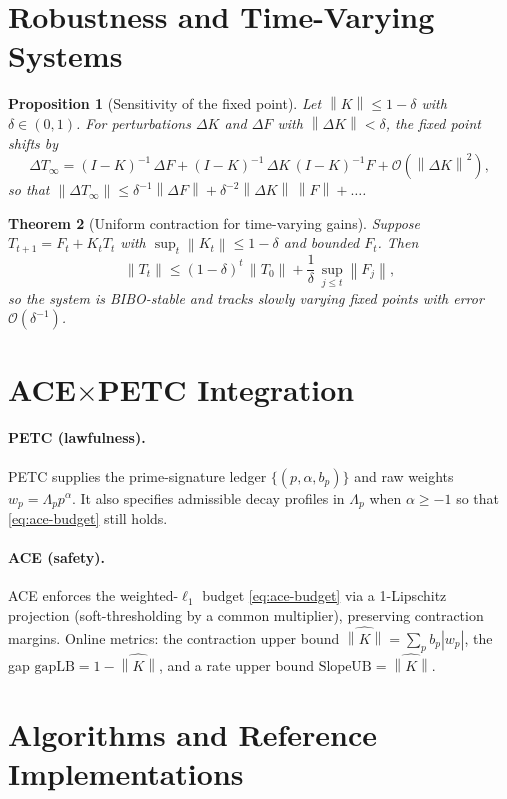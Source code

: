 \documentclass[11pt]{article}
\theoremstyle{plain}
\newtheorem{theorem}{Theorem}
\newtheorem{proposition}[theorem]{Proposition}
\theoremstyle{definition}
\theoremstyle{remark}
\newcommand{\norm}[1]{\left\lVert #1 \right\rVert}
\begin{document}
\section{Robustness and Time-Varying Systems}
\begin{proposition}[Sensitivity of the fixed point]
Let $\norm{K}\le 1-\delta$ with $\delta\in(0,1)$. For perturbations $\Delta K$ and $\Delta F$ with $\norm{\Delta K}<\delta$, the fixed point shifts by
\[
  \Delta T_\infty = (I-K)^{-1}\,\Delta F + (I-K)^{-1}\,\Delta K\,(I-K)^{-1}F + \mathcal{O}(\norm{\Delta K}^2),
\]
so that $\norm{\Delta T_\infty}\le \delta^{-1}\norm{\Delta F} + \delta^{-2}\norm{\Delta K}\,\norm{F}+\ldots$.
\end{proposition}

\begin{theorem}[Uniform contraction for time-varying gains]
Suppose $T_{t+1}=F_t+K_t T_t$ with $\sup_t\norm{K_t}\le 1-\delta$ and bounded $F_t$. Then
\[
  \norm{T_t}\le (1-\delta)^t\,\norm{T_0} + \frac{1}{\delta}\,\sup_{j\le t}\norm{F_j},
\]
so the system is BIBO-stable and tracks slowly varying fixed points with error $\mathcal{O}(\delta^{-1})$.
\end{theorem}

\section{ACE$\times$PETC Integration}
\paragraph{PETC (lawfulness).} PETC supplies the prime-signature ledger $\{(p,\alpha,b_p)\}$ and raw weights $w_p=\Lambda_p p^{\alpha}$. It also specifies admissible decay profiles in $\Lambda_p$ when $\alpha\ge -1$ so that \eqref{eq:ace-budget} still holds.

\paragraph{ACE (safety).} ACE enforces the weighted-$\ell_1$ budget \eqref{eq:ace-budget} via a 1-Lipschitz projection (soft-thresholding by a common multiplier), preserving contraction margins. Online metrics: the contraction upper bound $\widehat{\norm{K}}=\sum_p b_p|w_p|$, the gap $\mathrm{gapLB}=1-\widehat{\norm{K}}$, and a rate upper bound $\mathrm{SlopeUB}=\widehat{\norm{K}}$.

\section{Algorithms and Reference Implementations}
\end{document}
